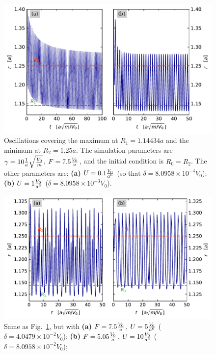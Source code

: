 \begin{figure}
\begin{center}
    \centering
    \includegraphics[width=1\linewidth]{Images/1.14434.pdf}
    \caption{Oscillations covering the maximum at $R_1 = 1.14434 a$ and the minimum at $R_2 = 1.25 a$. The simulation parameters are $\gamma = 10 \frac{1}{a}\sqrt{\frac{V_0}{m}}$, $F = 7.5 \frac{V_0}{a}$, and the initial condition is $R_0=R_2$. The other parameters are: \textbf{(a)} $U = 0.1 \frac{V_0}{a^6}$ (so that $\delta = 8.0958 \times 10^{-4} V_0$); \textbf{(b)} $U = 1 \frac{V_0}{a^6}$ ($\delta = 8.0958 \times 10^{-3} V_0$).}
    \label{Fig:1.14434}
\end{center}
\end{figure}

\begin{figure}
\begin{center}
    \centering
    \includegraphics[width=1\linewidth]{Images/1.14434_b.pdf}
    \caption{Same as Fig.~\ref{Fig:1.14434}, but with \textbf{(a)} $F = 7.5 \frac{V_0}{a}$, $U = 5 \frac{V_0}{a^6}$ ($\delta =  4.0479\times 10^{-2} V_0$); \textbf{(b)} $F = 5.05 \frac{V_0}{a}$, $U = 10 \frac{V_0}{a^6}$ ($\delta =  8.0958\times 10^{-2} V_0$);}
    \label{Fig:1.14434_b}
\end{center}
\end{figure}

